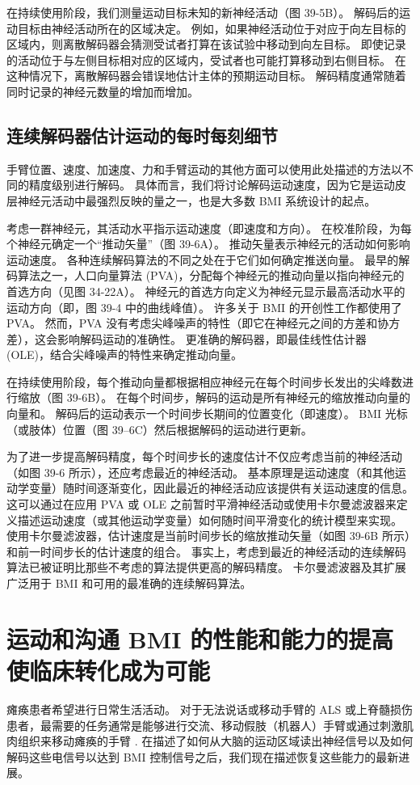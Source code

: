 在持续使用阶段，我们测量运动目标未知的新神经活动（图 39-5B）。 解码后的运动目标由神经活动所在的区域决定。 例如，如果神经活动位于对应于向左目标的区域内，则离散解码器会猜测受试者打算在该试验中移动到向左目标。 即使记录的活动位于与左侧目标相对应的区域内，受试者也可能打算移动到右侧目标。 在这种情况下，离散解码器会错误地估计主体的预期运动目标。 解码精度通常随着同时记录的神经元数量的增加而增加。

\subsection{连续解码器估计运动的每时每刻细节}
手臂位置、速度、加速度、力和手臂运动的其他方面可以使用此处描述的方法以不同的精度级别进行解码。 具体而言，我们将讨论解码运动速度，因为它是运动皮层神经元活动中最强烈反映的量之一，也是大多数 BMI 系统设计的起点。

考虑一群神经元，其活动水平指示运动速度（即速度和方向）。 在校准阶段，为每个神经元确定一个“推动矢量”（图 39-6A）。 推动矢量表示神经元的活动如何影响运动速度。 各种连续解码算法的不同之处在于它们如何确定推送向量。 最早的解码算法之一，人口向量算法 (PVA)，分配每个神经元的推动向量以指向神经元的首选方向（见图 34-22A）。 神经元的首选方向定义为神经元显示最高活动水平的运动方向（即，图 39-4 中的曲线峰值）。 许多关于 BMI 的开创性工作都使用了 PVA。 然而，PVA 没有考虑尖峰噪声的特性（即它在神经元之间的方差和协方差），这会影响解码运动的准确性。 更准确的解码器，即最佳线性估计器 (OLE)，结合尖峰噪声的特性来确定推动向量。

在持续使用阶段，每个推动向量都根据相应神经元在每个时间步长发出的尖峰数进行缩放（图 39-6B）。 在每个时间步，解码的运动是所有神经元的缩放推动向量的向量和。 解码后的运动表示一个时间步长期间的位置变化（即速度）。 BMI 光标（或肢体）位置（图 39–6C）然后根据解码的运动进行更新。

为了进一步提高解码精度，每个时间步长的速度估计不仅应考虑当前的神经活动（如图 39-6 所示），还应考虑最近的神经活动。 基本原理是运动速度（和其他运动学变量）随时间逐渐变化，因此最近的神经活动应该提供有关运动速度的信息。 这可以通过在应用 PVA 或 OLE 之前暂时平滑神经活动或使用卡尔曼滤波器来定义描述运动速度（或其他运动学变量）如何随时间平滑变化的统计模型来实现。 使用卡尔曼滤波器，估计速度是当前时间步长的缩放推动矢量（如图 39-6B 所示）和前一时间步长的估计速度的组合。 事实上，考虑到最近的神经活动的连续解码算法已被证明比那些不考虑的算法提供更高的解码精度。 卡尔曼滤波器及其扩展广泛用于 BMI 和可用的最准确的连续解码算法。


\section{运动和沟通 BMI 的性能和能力的提高使临床转化成为可能}
瘫痪患者希望进行日常生活活动。 对于无法说话或移动手臂的 ALS 或上脊髓损伤患者，最需要的任务通常是能够进行交流、移动假肢（机器人）手臂或通过刺激肌肉组织来移动瘫痪的手臂 . 在描述了如何从大脑的运动区域读出神经信号以及如何解码这些电信号以达到 BMI 控制信号之后，我们现在描述恢复这些能力的最新进展。

